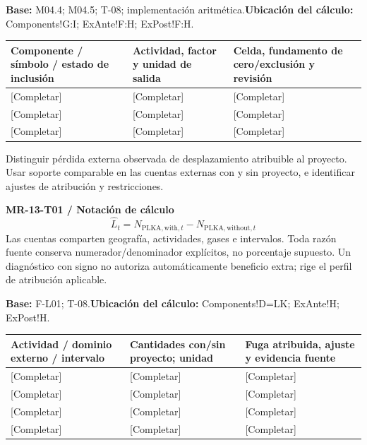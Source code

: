 \textbf{Base:} M04.4; M04.5; T-08; implementación aritmética.\quad\textbf{Ubicación del cálculo:} Components!G:I; ExAnte!F:H; ExPost!F:H.\par\endgroup
{\sffamily\fontsize{8.6}{10.7}\selectfont\begin{longtable}{@{}P{48mm}P{61mm}P{53mm}@{}}
\toprule
\textbf{Componente / símbolo / estado de inclusión} & \textbf{Actividad, factor y unidad de salida} & \textbf{Celda, fundamento de cero/exclusión y revisión}\\\midrule\endhead
\rule{0pt}{8mm}[Completar] & [Completar] & [Completar]\\\hline
\rule{0pt}{8mm}[Completar] & [Completar] & [Completar]\\\hline
\rule{0pt}{8mm}[Completar] & [Completar] & [Completar]\\\hline
\end{longtable}}
Distinguir pérdida externa observada de desplazamiento atribuible al proyecto. Usar soporte comparable en las cuentas externas con y sin proyecto, e identificar ajustes de atribución y restricciones.\par
{}
\par\begingroup\sffamily\fontsize{8.4}{10.5}\selectfont\color{NEBGreen}
\textbf{MR-13-T01 / Notación de cálculo}\
{\fontsize{10}{12}\selectfont\[\widehat L_t=N_{\mathrm{PLKA,with},t}-N_{\mathrm{PLKA,without},t}\]}
Las cuentas comparten geografía, actividades, gases e intervalos. Toda razón fuente conserva numerador/denominador explícitos, no porcentaje supuesto. Un diagnóstico con signo no autoriza automáticamente beneficio extra; rige el perfil de atribución aplicable.\par
\textbf{Base:} F-L01; T-08.\quad\textbf{Ubicación del cálculo:} Components!D=LK; ExAnte!H; ExPost!H.\par\endgroup
{\sffamily\fontsize{8.6}{10.7}\selectfont\begin{longtable}{@{}P{48mm}P{61mm}P{53mm}@{}}
\toprule
\textbf{Actividad / dominio externo / intervalo} & \textbf{Cantidades con/sin proyecto; unidad} & \textbf{Fuga atribuida, ajuste y evidencia fuente}\\\midrule\endhead
\rule{0pt}{8mm}[Completar] & [Completar] & [Completar]\\\hline
\rule{0pt}{8mm}[Completar] & [Completar] & [Completar]\\\hline
\rule{0pt}{8mm}[Completar] & [Completar] & [Completar]\\\hline
\rule{0pt}{8mm}[Completar] & [Completar] & [Completar]\\\hline
\end{longtable}}

